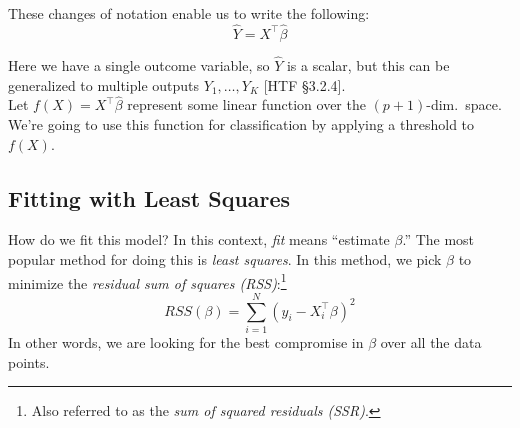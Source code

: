 \documentclass[a4paper]{article}
\begin{document}
These changes of notation enable us to write the following:
$$\hat{Y}=X^\top\hat{\beta}$$

Here we have a single outcome variable, so $\hat Y$ is a scalar, but this can be generalized to multiple outputs $Y_1,\ldots,Y_K$ [HTF \S3.2.4]. \\

Let $f(X)=X^\top\hat{\beta}$ represent some linear function over the $(p+1)$-dim.\ space. We're going to use this function for classification by applying a threshold to $f(X)$.

\subsection{Fitting with Least Squares}

How do we fit this model?  In this context, \emph{fit} means ``estimate $\beta$.'' The most popular method for doing this is \emph{least squares}.  In this method, we pick $\beta$ to minimize the \emph{residual sum of squares (RSS)}:\footnote{Also referred to as the \emph{sum of squared residuals (SSR)}.}
$$RSS(\beta)=\sum_{i=1}^N(y_i-X_i^\top\beta)^2$$
In other words, we are looking for the best compromise in $\beta$ over all the data points.
\end{document}
